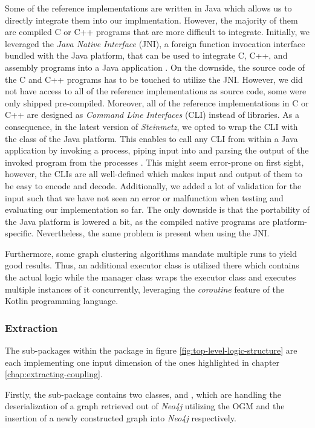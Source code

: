 \documentclass[12pt,a4paper]{report}
\begin{document}
Some of the reference implementations are written in Java which allows us to directly
integrate them into our implmentation. However, the majority of them are compiled C or
C++ programs that are more difficult to integrate.
Initially, we leveraged the \textit{Java Native Interface} (JNI), a foreign function
invocation interface bundled with the Java platform, that can be used to integrate
C, C++, and assembly programs into a Java application \cite{jni}.
On the downside, the source code of the C and C++ programs has to be touched to utilize
the JNI. However, we did not have access to all of the reference implementations as source
code, some were only shipped pre-compiled.
Moreover, all of the reference implementations in C or C++ are designed as
\textit{Command Line Interfaces} (CLI) instead of libraries.
As a consequence, in the latest version of \textit{Steinmetz}, we opted to wrap the
CLI with the  class of the Java platform.
This enables to call any CLI from within a Java application by invoking a process,
piping input into  and parsing the output of the invoked program from
the processes . This might seem error-prone on first sight, however,
the CLIs are all well-defined which makes input and output of them to be easy to
encode and decode.
Additionally, we added a lot of validation for the input such that we have not seen
an error or malfunction when testing and evaluating our implementation so far.
The only downside is that the portability of the Java platform is lowered a bit,
as the compiled native programs are platform-specific. Nevertheless, the same problem
is present when using the JNI.

Furthermore, some graph clustering algorithms mandate multiple runs to yield good results.
Thus, an additional executor class is utilized there which contains the actual logic while
the manager class wraps the executor class and executes multiple instances of it concurrently,
leveraging the \textit{coroutine} feature of the Kotlin programming language.


\subsubsection{Extraction}
The sub-packages within the package  in figure
\ref{fig:top-level-logic-structure} are each implementing one input dimension of the
ones highlighted in chapter \ref{chap:extracting-coupling}.

Firstly, the sub-package  contains two classes,
 and , which are handling the deserialization
of a graph retrieved out of \textit{Neo4j} utilizing the OGM and the insertion of
a newly constructed graph into \textit{Neo4j} respectively.
\end{document}

